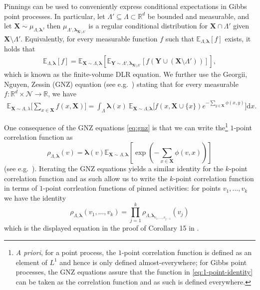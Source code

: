 \documentclass[10pt]{amsart}
\theoremstyle{definition}
\theoremstyle{remark}
\newcommand{\pointsets}{\mathcal{N}}
\newcommand{\bX}{\mathbf{X}}
\newcommand{\bY}{\mathbf{Y}}
\newcommand{\blambda}{{\boldsymbol{\lambda}}}
\newcommand{\E}{\mathbb{E}}
\newcommand{\R}{\mathbb{R}}
\newcommand{\region}{\Lambda}
\newcommand{\activity}{\lambda}
\newcommand{\activities}{\pmb{\lambda}}
\newcommand{\diff}{\mathrm{d}}
\begin{document}
	Pinnings can be used to conveniently express conditional expectations in Gibbs point processes.
	In particular, let $\region' \subseteq \region \subset \R^d$ be bounded and measurable, and let $\bX \sim \mu_{\region, \activities}$, then $\mu_{\region', \activities_{\bX \setminus \region'}}$ is a regular conditional distribution for $\bX \cap \region'$ given $\bX \setminus \region'$.
	Equivalently, for every measurable function $f$ such that $\E_{\region, \activities}[f]$ exists, it holds that
	\begin{align}
		\E_{\region, \activities}[f] = \E_{\bX \sim \region, \activities}[\E_{\bY \sim \region', \activities_{\bX \setminus \region'}}[f(\bY \cup (\bX \setminus \region'))]] , \label{eq:finite_DLR}
	\end{align}
	which is known as the finite-volume DLR equation. We further use the Georgii, Nguyen, Zessin (GNZ) equation (see e.g.\  \cite{daley2008introduction}) stating that for every measurable $f: \R^d \times \pointsets \rightarrow \R$, we have 
	\begin{align}\label{eq:gnz}
		\E_{\bX \sim \region, \activity}\Big[\sum_{x \in \bX}f(x, \bX)\Big] = \int_{\region} \activities(x) \ \E_{\bX\sim\region, \activities} \big[ f(x, \bX \cup \{x\}) e^{-\sum_{y \in \bX}\phi(x, y)}\big] \diff x.
	\end{align}
	
	One consequence of the GNZ equations \eqref{eq:gnz} is that we can write the\footnote{\emph{A priori}, for a point process, the $1$-point correlation function is defined as an element of $L^1$ and hence is only defined almost-everywhere; for Gibbs point processes, the GNZ equations assure that the function in \eqref{eq:1-point-identity} can be taken as the correlation function and as such is defined everywhere.} $1$-point correlation function as 
	\begin{equation}\label{eq:1-point-identity}
		\rho_{\Lambda,\blambda}(v) = \blambda(v) \E_{\bX \sim \Lambda,\blambda}\left[\exp\left(-\sum_{x \in \bX} \phi(v,x) \right) \right]
	\end{equation}
	(see e.g.\ \cite[Eq.~(11)]{michelen2022strong}).  Iterating the GNZ equations yields a similar identity for the $k$-point correlation function and as such allow us to write the $k$-point correlation function in terms of $1$-point corrleation functions of pinned activities: for points $v_1,\ldots,v_k$ we have the identity \begin{equation}\label{eq:multipoint-correlation-identity}
		\rho_{\Lambda,\blambda}(v_1,\ldots,v_k) = \prod_{j = 1}^k \rho_{\Lambda,\blambda_{v_1,\ldots,v_{j-1}}}(v_j)
	\end{equation}
	which is the displayed equation in the proof of Corollary 15 in \cite{michelen2022strong}. 
	
\end{document}
